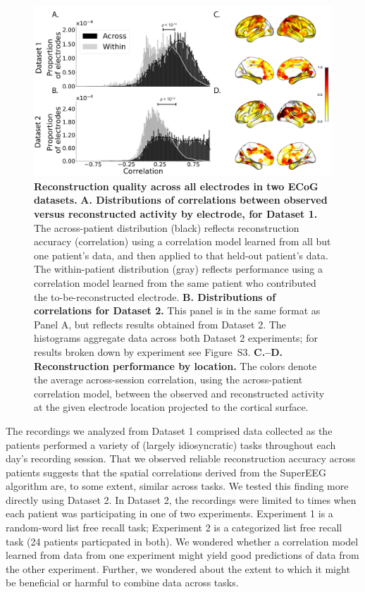 \documentclass[11pt]{article}
\newcommand{\perexptaskreconseparated}{S3}
\begin{document}
\begin{figure}
  \centering
  \includegraphics[width=\textwidth]{figs/corrmap}
  \caption{\textbf{Reconstruction quality across all electrodes in two
      ECoG datasets.}  \textbf{A. Distributions of correlations
      between observed versus reconstructed activity by electrode, for
      Dataset 1.}  The across-patient distribution (black) reflects
    reconstruction accuracy (correlation) using a correlation model
    learned from all but one patient's data, and then applied to that
    held-out patient's data.  The within-patient distribution (gray)
    reflects performance using a correlation model learned from the same
    patient who contributed the to-be-reconstructed electrode.
    \textbf{B. Distributions of correlations for Dataset 2.}  This
    panel is in the same format as Panel A, but reflects results
    obtained from Dataset 2.  The histograms aggregate data across
    both Dataset 2 experiments; for results broken down by experiment
    see Figure~\perexptaskreconseparated. \textbf{C.--D.  Reconstruction
      performance by location.} The colors denote the average across-session
    correlation, using the across-patient correlation model, between
    the observed and reconstructed activity at the given electrode
    location projected to the cortical surface.}
  \label{fig:corrmap}
\end{figure}

The recordings we analyzed from Dataset 1 comprised data collected as
the patients performed a variety of (largely idiosyncratic) tasks
throughout each day's recording session.  That we observed reliable
reconstruction accuracy across patients suggests that the spatial
correlations derived from the SuperEEG algorithm are, to some extent,
similar across tasks.  We tested this finding more directly using
Dataset 2.  In Dataset 2, the recordings were limited to times when
each patient was participating in one of two experiments.  Experiment
1 is a random-word list free recall task; Experiment 2 is a
categorized list free recall task (24 patients particpated in both).  We wondered whether a correlation
model learned from data from one experiment might yield good
predictions of data from the other experiment.  Further, we wondered
about the extent to which it might be beneficial or harmful to combine
data across tasks.
\end{document}
